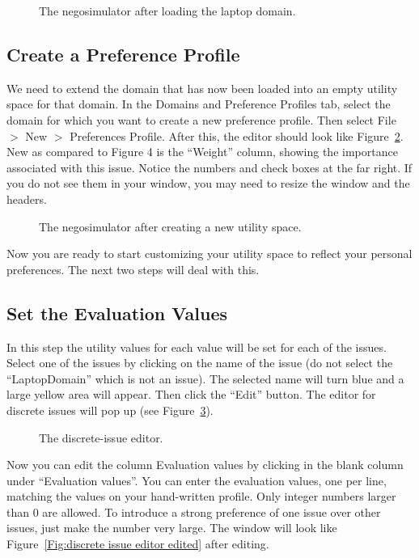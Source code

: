 \documentclass[]{article}
\begin{document}
\begin{figure}
\caption{The negosimulator after loading the laptop domain.}\label{Fig:negosimulator domain loaded}
\end{figure}

\subsection{Create a Preference Profile}
We need to extend the domain that has now been loaded into an empty utility space for that domain. In the Domains and Preference Profiles tab, select the domain for which you want to create a new preference profile. Then select File $>$ New $>$ Preferences Profile. After this, the editor should look like Figure~\ref{Fig:negosimulator utility space created}. New as compared to Figure 4 is the ``Weight'' column, showing the importance associated with this issue. Notice the numbers and check boxes at the far right. If you do not see them in your window, you may need to resize the window and the headers.

\begin{figure}
\caption{The negosimulator after creating a new utility space.}\label{Fig:negosimulator utility space created}
\end{figure}

Now you are ready to start customizing your utility space to reflect your personal preferences. The next two steps will deal with this.

\subsection{Set the Evaluation Values}
In this step the utility values for each value will be set for each of the issues. Select one of the issues by clicking on the name of the issue (do not select the ``LaptopDomain'' which is not an issue). The selected name will turn blue and a large yellow area will appear. Then click the ``Edit'' button. The editor for discrete issues will pop up (see Figure~\ref{Fig:discrete issue editor}).

\begin{figure}
\caption{The discrete-issue editor.}\label{Fig:discrete issue editor}
\end{figure}

Now you can edit the column Evaluation values by clicking in the blank column under ``Evaluation values''. You can enter the evaluation values, one per line, matching the values on your hand-written profile. Only integer numbers larger than 0 are allowed. To introduce a strong preference of one issue over other issues, just make the number very large. The window will look like Figure~\ref{Fig:discrete issue editor edited} after editing.
\end{document}
